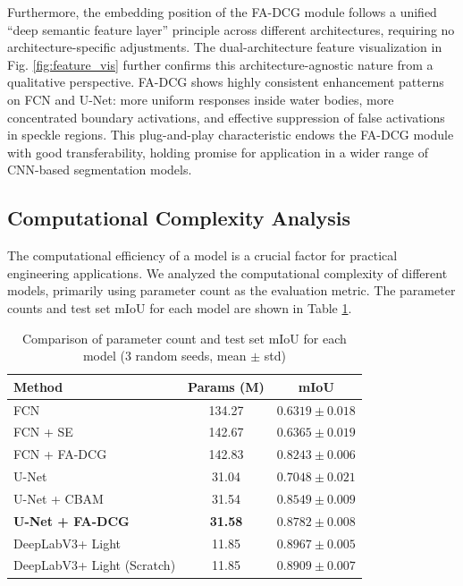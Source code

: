 \documentclass[lettersize,journal]{IEEEtran}
\begin{document}
Furthermore, the embedding position of the FA-DCG module follows a unified ``deep semantic feature layer'' principle across different architectures, requiring no architecture-specific adjustments. The dual-architecture feature visualization in Fig. \ref{fig:feature_vis} further confirms this architecture-agnostic nature from a qualitative perspective. FA-DCG shows highly consistent enhancement patterns on FCN and U-Net: more uniform responses inside water bodies, more concentrated boundary activations, and effective suppression of false activations in speckle regions. This plug-and-play characteristic endows the FA-DCG module with good transferability, holding promise for application in a wider range of CNN-based segmentation models.

\subsection{Computational Complexity Analysis}

The computational efficiency of a model is a crucial factor for practical engineering applications. We analyzed the computational complexity of different models, primarily using parameter count as the evaluation metric. The parameter counts and test set mIoU for each model are shown in Table \ref{tab:complexity}.

\begin{table}[htbp]
\centering
\caption{Comparison of parameter count and test set mIoU for each model (3 random seeds, mean $\pm$ std)}
\label{tab:complexity}
\begin{tabular}{lcc}
\toprule
Method & Params (M) & mIoU \\
\midrule
FCN & 134.27 & $0.6319 \pm 0.018$ \\
FCN + SE & 142.67 & $0.6365 \pm 0.019$ \\
FCN + FA-DCG & 142.83 & $0.8243 \pm 0.006$ \\
U-Net & 31.04 & $0.7048 \pm 0.021$ \\
U-Net + CBAM & 31.54 & $0.8549 \pm 0.009$ \\
\textbf{U-Net + FA-DCG} & \textbf{31.58} & $\mathbf{0.8782 \pm 0.008}$ \\
DeepLabV3+ Light & 11.85 & $0.8967 \pm 0.005$ \\
DeepLabV3+ Light (Scratch) & 11.85 & $0.8909 \pm 0.007$ \\
\bottomrule
\end{tabular}
\end{table}
\end{document}
